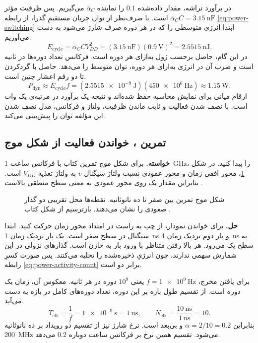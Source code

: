 در برآورد تراشه، مقدار داده‌شده \(0.1\) را نماینده
\(\bar\alpha_C\) می‌گیریم. پس ظرفیت مؤثر
\(\bar\alpha_C C=\qty{3.15}{\nano\farad}\) است. با صرف‌نظر از توان
جریان مستقیمِ گذرا، از رابطه \eqref{eq:power-switching} ابتدا انرژی
متوسطی را که در هر دوره صرف شارژ می‌شود به دست می‌آوریم.
\[
  E_{\mathrm{cycle}}=\bar\alpha_C C V_{DD}^{2}
    =(\qty{3.15}{\nano\farad})(\qty{0.9}{\volt})^2
    =\qty{2.5515}{\nano\joule}.
\]
در این گام، حاصل برحسب ژول به‌ازای هر دوره است. فرکانس تعداد دوره‌ها
در ثانیه است و ضرب آن در انرژی به‌ازای هر دوره، توان متوسط را می‌دهد.
حاصل با گردکردن تا دو رقم اعشار چنین است.
\[
  P_{\mathrm{dyn}}\approx E_{\mathrm{cycle}} f
     =(\qty{2.5515e-9}{\joule})(\qty{450e6}{\hertz})
     \approx\qty{1.15}{\watt}.
\]
ارقام میانی برای نمایش محاسبه حفظ شده‌اند و نتیجه یک برآورد در
مرتبه‌ی یک وات است. با نصف شدن فعالیت و ثابت ماندن ظرفیت، ولتاژ
و فرکانس، مدل نصف شدن این مؤلفه توان را پیش‌بینی می‌کند.

\subsection{تمرین ، خواندن فعالیت از شکل موج}
\label{sec:power-exercise-waveform}

\textbf{خواسته.}
برای شکل موج تمرین  کتاب با فرکانس ساعت
\qty{1}{\giga\hertz}،  را پیدا کنید. در شکل
\ref{fig:power-exercise-waveform}، محور افقی زمان و محور عمودی
نسبت ولتاژ سیگنال \(v\) به ولتاژ تغذیه \(V_{DD}\) است. بنابراین
مقدار یک روی محور عمودی به معنی سطح منطقی بالاست
\cite[تمرین  و شکل ، صفحه ۲۰۹]{weste}.

\begin{figure}[htbp]
  \centering
  
  \caption{شکل موج تمرین  بین صفر تا ده نانوثانیه.
    نقطه‌ها محل تقریبی دو گذار صعودی را نشان می‌دهند. بازترسیم از
    شکل  کتاب \cite{weste}.}
  \label{fig:power-exercise-waveform}
\end{figure}

\textbf{حل.}
برای خواندن نمودار، از چپ به راست در امتداد محور زمان حرکت کنید.
ابتدا سیگنال در سطح صفر است. یک بار نزدیک زمان \qty{1}{\nano\second}
و بار دوم نزدیک زمان \qty{4}{\nano\second} به سطح یک می‌رود. هر بالا رفتن
متناظر با ورود بار به خازن است. گذارهای نزولی در این شمارش سهمی
ندارند، چون انرژیِ ذخیره‌شده را تخلیه می‌کنند. پس صورت کسرِ رابطه
\eqref{eq:power-activity-count} برابر دو است.

برای یافتن مخرج، \(f=\qty{1e9}{\hertz}\) یعنی \(10^9\) دوره در
هر ثانیه. معکوس آن، زمان یک دوره است. از تقسیم طول بازه بر این
دوره، تعداد دوره‌های کامل در بازه به دست می‌آید.
\[
  T_{\mathrm{clk}}=\frac{1}{f}=\qty{1e-9}{\second}
     =\qty{1}{\nano\second},\qquad
  N_{\mathrm{clk}}=\frac{\qty{10}{\nano\second}}{\qty{1}{\nano\second}}=10.
\]
بنابراین \(\alpha=2/10=0.2\) و بی‌بعد است. نرخ شارژ نیز از تقسیم
دو رویداد بر ده نانوثانیه \qty{200}{\mega\hertz} می‌شود. تقسیم
همین نرخ بر فرکانس ساعت دوباره \(0.2\) می‌دهد.

